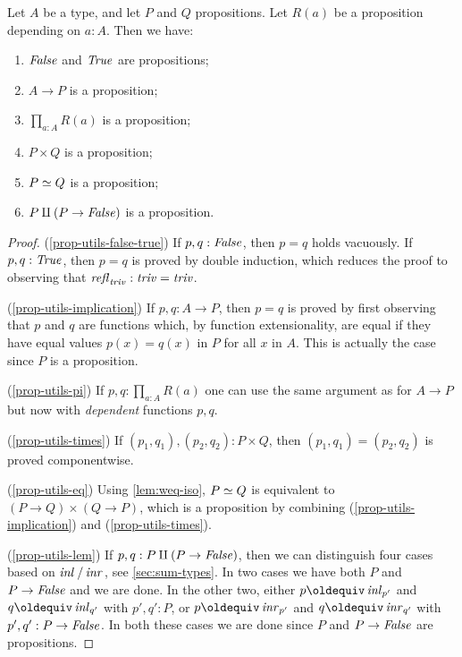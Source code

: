 \begin{lemma}\label{lem:prop-utils}
Let $A$ be a type, and let $P$ and $Q$ propositions.
Let $R(a)$ be a proposition depending on $a:A$. Then we have:
\begin{enumerate}
\item\label{prop-utils-false-true} $\mathop{\mathit{False}}$ and $\mathop{\mathit{True}}$ are propositions;
\item\label{prop-utils-implication} $A\to P$ is a proposition;
\item\label{prop-utils-pi} $\prod_{a:A} R(a)$ is a proposition;
\item\label{prop-utils-times} $P\times Q$ is a proposition;
\item\label{prop-utils-eq} $P \simeq Q$ is a proposition;
\item\label{prop-utils-lem} $P \amalg (P\to\mathop{\mathit{False}})$ is a proposition.
\end{enumerate}
\end{lemma}

\begin{proof}
(\ref{prop-utils-false-true})
If $p,q : \mathop{\mathit{False}}$, then $p=q$ holds vacuously.
If $p,q : \mathop{\mathit{True}}$, then $p=q$ is proved by double induction,
which reduces the proof to observing that $\mathop{{\it refl}_{\mathop{\mathit{triv}}}}: \mathop{\mathit{triv}}=\mathop{\mathit{triv}}$.

(\ref{prop-utils-implication})
If $p,q : A\to P$, then $p=q$ is proved by first observing that $p$ and $q$
are functions which, by function extensionality, are equal if they have
equal values $p(x) = q(x)$ in $P$ for all $x$ in $A$. This is
actually the case since $P$ is a proposition.

(\ref{prop-utils-pi})
If $p,q : \prod_{a:A} R(a)$ one can use the same argument as for $A\to P$
but now with \emph{dependent} functions $p,q$.

(\ref{prop-utils-times})
If $(p_1,q_1),(p_2,q_2) : P\times Q$, then $(p_1,q_1)=(p_2,q_2)$
is proved componentwise. 

(\ref{prop-utils-eq})
Using \cref{lem:weq-iso}, $P \simeq Q$ is equivalent to
$(P\to Q)\times(Q\to P)$, which is a proposition by 
combining (\ref{prop-utils-implication}) and (\ref{prop-utils-times}).

(\ref{prop-utils-lem}) 
If $p,q : P\amalg (P\to\mathop{\mathit{False}})$, then we can distinguish four cases
based on $\mathop{{\it inl}_{}}/\mathop{{\it inr}_{}}$, see \cref{sec:sum-types}. In two cases
we have both $P$ and $P\to\mathop{\mathit{False}}$ and we are done. In the other two,
either $p\jdeq \inl{p'}$ and $q\jdeq \inl{q'}$ with $p',q':P$,
or $p\jdeq \inr{p'}$ and $q\jdeq \inr{q'}$ with $p',q':P\to\mathop{\mathit{False}}$.
In both these cases we are done since $P$ and $P\to\mathop{\mathit{False}}$ 
are propositions.
\end{proof}


